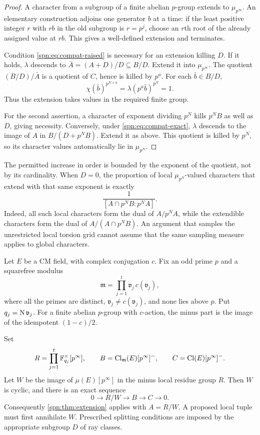 \begin{proof}
A character from a subgroup of a finite abelian $p$-group extends to
$\mu_{p^\infty}$. An elementary construction adjoins one generator $b$ at a
time: if the least positive integer $r$ with $rb$ in the old subgroup is
$r=p^j$, choose an $r$th root of the already assigned value at $rb$. This
gives a well-defined extension and terminates.

Condition \eqref{spn:eq:compat-raised} is necessary for an extension killing
$D$. If it holds, $\lambda$ descends to $\bar A=(A+D)/D\subseteq B/D$. Extend
it into $\mu_{p^\infty}$. The quotient $(B/D)/\bar A$ is a quotient of $C$,
hence is killed by $p^a$. For each $\bar b\in B/D$,
\[
 \chi(\bar b)^{p^{N+a}}=\lambda(p^a\bar b)^{p^N}=1 .
\]
Thus the extension takes values in the required finite group.

For the second assertion, a character of exponent dividing $p^N$ kills $p^NB$
as well as $D$, giving necessity. Conversely, under
\eqref{spn:eq:compat-exact}, $\lambda$ descends to the image of $A$ in
$B/(D+p^NB)$. Extend it as above. This quotient is killed by $p^N$, so its
character values automatically lie in $\mu_{p^N}$.
\end{proof}

The permitted increase in order is bounded by the exponent of the quotient,
not by its cardinality. When $D=0$, the proportion of local
$\mu_{p^N}$-valued characters that extend with that same exponent is exactly
\begin{equation}\label{spn:eq:proportion}
 \frac{1}{[A\cap p^NB:p^NA]} .
\end{equation}
Indeed, all such local characters form the dual of $A/p^NA$, while the
extendible characters form the dual of $A/(A\cap p^NB)$. An argument that
samples the unrestricted local torsion grid cannot assume that the same
sampling measure applies to global characters.

Let $E$ be a CM field, with complex conjugation $c$. Fix an odd prime $p$ and
a squarefree modulus
\[
 \mathfrak m=\prod_{j=1}^t\mathfrak v_j\,c(\mathfrak v_j),
\]
where all the primes are distinct, $\mathfrak v_j\ne c(\mathfrak v_j)$, and
none lies above $p$. Put $q_j=\operatorname{N}\mathfrak v_j$. For a finite abelian
$p$-group with $c$-action, the minus part is the image of the idempotent
$(1-c)/2$.

\begin{theorem}\label{spn:thm:ray}
Set
\[
 R=\prod_{j=1}^t\mathbb{F}_{q_j}^{\times}[p^\infty],\qquad
 B=\operatorname{Cl}_{\mathfrak m}(E)[p^\infty]^{-},\qquad C=\operatorname{Cl}(E)[p^\infty]^{-}.
\]
Let $W$ be the image of $\mu(E)[p^\infty]$ in the minus local residue group
$R$. Then $W$ is cyclic, and there is an exact sequence
\begin{equation}\label{spn:eq:ray}
 0\longrightarrow R/W\longrightarrow B\longrightarrow C\longrightarrow0 .
\end{equation}
Consequently \cref{spn:thm:extension} applies with $A=R/W$. A proposed local
tuple must first annihilate $W$. Prescribed splitting conditions are imposed
by the appropriate subgroup $D$ of ray classes.
\end{theorem}


